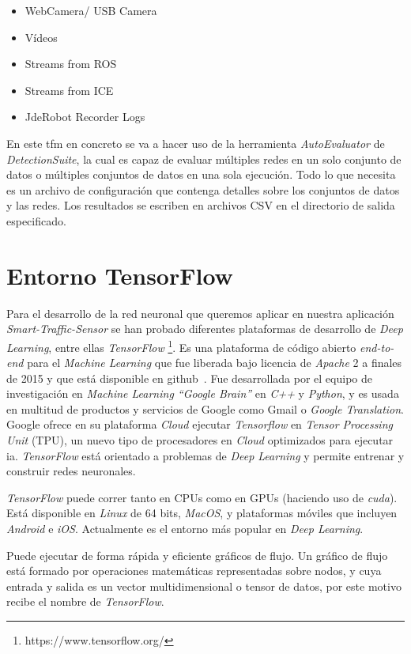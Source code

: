 \begin{itemize}
    \item WebCamera/ USB Camera
    \item Vídeos
    \item Streams from ROS
    \item Streams from ICE
    \item JdeRobot Recorder Logs
\end{itemize}

En este \acrshort{tfm} en concreto se va a hacer uso de la herramienta \textit{AutoEvaluator} de \textit{DetectionSuite}, la cual es capaz de evaluar múltiples redes en un solo conjunto de datos o múltiples conjuntos de datos en una sola ejecución. Todo lo que necesita es un archivo de configuración que contenga detalles sobre los conjuntos de datos y las redes. Los resultados se escriben en archivos CSV en el directorio de salida especificado.

\section{Entorno TensorFlow}
Para el desarrollo de la red neuronal que queremos aplicar en nuestra aplicación \textit{Smart-Traffic-Sensor} se  han probado diferentes plataformas de desarrollo de \textit{Deep Learning}, entre ellas \textit{TensorFlow} \footnote{https://www.tensorflow.org/}. Es una plataforma de código abierto \textit{end-to-end} para el \textit{Machine Learning} que fue liberada bajo licencia de \textit{Apache} 2 a finales de 2015 y que está disponible en github~\cite{github_tensorflow}. Fue desarrollada por el equipo de investigación en \textit{Machine Learning “Google Brain”}  en \textit{C++} y \textit{Python}, y es usada en multitud de productos y servicios de Google como Gmail o \textit{Google Translation}. Google ofrece en su plataforma \textit{Cloud} ejecutar \textit{Tensorflow} en \textit{Tensor Processing Unit} (TPU), un nuevo tipo de procesadores en \textit{Cloud} optimizados para ejecutar \acrfull{ia}.  \textit{TensorFlow} está orientado a problemas de \textit{Deep Learning} y permite entrenar y construir redes neuronales. 

\textit{TensorFlow} puede correr tanto en CPUs como en GPUs (haciendo uso de \textit{\acrfull{cuda}}). Está disponible en \textit{Linux} de 64 bits, \textit{MacOS}, y plataformas móviles que incluyen \textit{Android} e \textit{iOS}. Actualmente es el entorno más popular en \textit{Deep Learning}.

Puede ejecutar de forma rápida y eficiente gráficos de flujo. Un gráfico de flujo está formado por operaciones matemáticas representadas sobre nodos, y cuya entrada y salida es un vector multidimensional o tensor de datos, por este motivo recibe el nombre de \textit{TensorFlow}.

